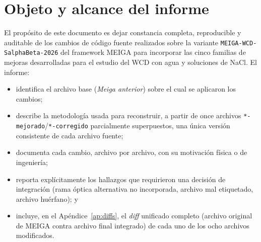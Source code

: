 \documentclass[11pt,a4paper]{article}
\newcommand{\codigo}[1]{\nolinkurl{#1}}
\begin{document}
\begin{abstract}
\noindent
Este informe documenta la integración, en una única base de código
consistente, de las cinco familias de mejoras desarrolladas de forma
incremental para el detector Cherenkov de agua (WCD) del framework MEIGA:
(1) el registro paso a paso de \codigo{G4WCDSteppingAction}; (2) las
densidades y la composición de las soluciones de NaCl al 2.5, 5.0 y 10.0\,\%;
(3) la corrección óptica del recubrimiento de Tyvek (propiedad
\codigo{RINDEX} en \codigo{linerOpticalPT}) junto con las tablas ópticas
diferenciadas por concentración; (4) una propuesta alternativa de
propiedades ópticas basada en interpolación y dispersión de Rayleigh; y
(5) las correcciones de la respuesta del PMT (\codigo{G4MPMTAction},
\codigo{OptDevice}, material efectivo del fotocátodo). El resultado es un
único árbol de código fuente, derivado de la variante
\codigo{MEIGA-WCD-SalphaBeta-2026}, que conserva el tratamiento térmico
S($\alpha,\beta$) del hidrógeno del agua y añade, de forma consistente,
todas las correcciones ópticas y de respuesta del PMT revisadas en los
informes técnicos previos. Se documentan también las inconsistencias
encontradas en los archivos de entrada (una rama óptica alternativa
incompatible con la finalmente adoptada, un archivo con nombre incorrecto,
y un archivo huérfano con nombre corrupto) y la manera en que se
resolvieron.
\end{abstract}

\tableofcontents

\section{Objeto y alcance del informe}

El propósito de este documento es dejar constancia completa, reproducible
y auditable de los cambios de código fuente realizados sobre la variante
\codigo{MEIGA-WCD-SalphaBeta-2026} del framework MEIGA para incorporar las
cinco familias de mejoras desarrolladas para el estudio del WCD con agua y
soluciones de NaCl. El informe:

\begin{itemize}
  \item identifica el archivo base (\emph{Meiga anterior}) sobre el cual se
    aplicaron los cambios;
  \item describe la metodología usada para reconstruir, a partir de once
    archivos \codigo{*-mejorado}/\codigo{*-corregido} parcialmente
    superpuestos, una única versión consistente de cada archivo fuente;
  \item documenta cada cambio, archivo por archivo, con su motivación
    física o de ingeniería;
  \item reporta explícitamente los hallazgos que requirieron una decisión
    de integración (rama óptica alternativa no incorporada, archivo mal
    etiquetado, archivo huérfano); y
  \item incluye, en el Apéndice~\ref{ap:diffs}, el \emph{diff} unificado
    completo (archivo original de MEIGA contra archivo final integrado)
    de cada uno de los ocho archivos modificados.
\end{itemize}
\end{document}
